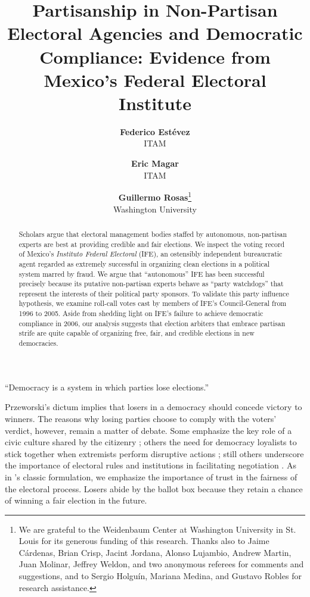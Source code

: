 \documentclass[12 pt, letter]{article}
\begin{document}
\title{Partisanship in Non-Partisan Electoral Agencies and Democratic Compliance: Evidence from Mexico's Federal Electoral Institute}
\author{
\textbf{Federico Est\'evez}\\ITAM
\and
\textbf{Eric Magar}\\ITAM
\and
\textbf{Guillermo Rosas}\thanks{We are grateful to the Weidenbaum Center at Washington University in St. Louis for its generous funding of this research.  Thanks also to Jaime C\'ardenas, Brian Crisp, Jacint Jordana, Alonso Lujambio, Andrew Martin, Juan Molinar, Jeffrey Weldon, and two anonymous referees for comments and suggestions, and to Sergio Holgu\'in, Mariana Medina, and Gustavo Robles for research assistance.}\\Washington University}


\date{}
\maketitle

\begin{abstract}
\noindent Scholars argue that electoral management bodies staffed by
autonomous, non-partisan experts are best at providing credible and
fair elections.  We inspect the voting record of Mexico's
\emph{Instituto Federal Electoral} (IFE), an ostensibly independent
bureaucratic agent regarded as extremely successful in organizing
clean elections in a political system marred by fraud. We argue that
``autonomous'' IFE has been successful precisely because its
putative non-partisan experts behave as ``party watchdogs'' that
represent the interests of their political party sponsors.  To
validate this party influence hypothesis, we examine roll-call votes
cast by members of IFE's Council-General from 1996 to 2005. Aside
from shedding light on IFE's failure to achieve democratic
compliance in 2006, our analysis suggests that election arbiters
that embrace partisan strife  are quite capable of organizing free,
fair, and credible elections in new democracies. \end{abstract}

\bigskip

\begin{flushright}
``Democracy is a system in which parties lose
elections.'' \\ \citet[p. 10]{Przeworski1991} \doublespacing
\end{flushright}

\doublespace \noindent Przeworski's dictum implies that losers in a
democracy should concede victory to winners. The reasons why losing
parties choose to comply with the voters' verdict, however, remain a
matter of debate. Some emphasize the key role of a civic culture
shared by the citizenry \citep[e.g.,][]{Putnam2000}; others the need
for democracy loyalists to stick together when extremists perform
disruptive actions \citep[e.g.,][]{Linz1978}; still others
underscore the importance of electoral rules and institutions in
facilitating negotiation \citep[e.g.,][]{Jones1995}. As in
\citeauthor{Przeworski1991}'s classic formulation, we emphasize the
importance of trust in the fairness of the electoral process. Losers
abide by the ballot box because they retain a chance of winning a
fair election in the future.
\end{document}

